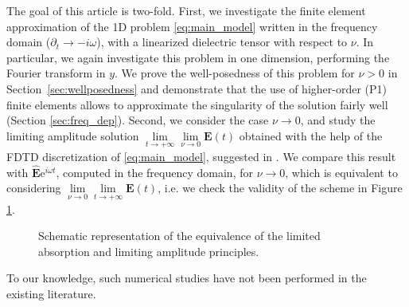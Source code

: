 The goal of this article is two-fold. 
First, we investigate the finite element approximation of the 1D 
problem \eqref{eq:main_model} written in the frequency domain ($\partial_t\rightarrow -i\omega$), with a linearized dielectric tensor with respect to $\nu$.
In particular, we again investigate this problem in one dimension, performing the Fourier transform in $y$.
We prove the well-posedness of this problem for $\nu>0$ in Section~\ref{sec:wellposedness} and 
demonstrate that the use of higher-order (P1) finite elements allows to approximate the singularity 
of the solution fairly well (Section \ref{sec:freq_dep}). 
Second, we consider the case $\nu\rightarrow 0$, and study the limiting amplitude solution 
$\lim\limits_{t\rightarrow +\infty}\lim\limits_{\nu\rightarrow 0}\mathbf{E}(t)$ obtained with the help of 
the FDTD discretization of \eqref{eq:main_model}, suggested in \cite{stable_yee_plasma_current}. 
We compare this result with 
$\hat{\mathbf{E}}\mathrm{e}^{i\omega t}$, computed in the frequency domain, for $\nu\rightarrow 0$, which is equivalent to considering
$\lim\limits_{\nu\rightarrow 0}\lim\limits_{t\rightarrow+\infty}\mathbf{E}(t)$, i.e. we check the validity of the scheme in Figure \ref{fig:limits}. 
\begin{figure}
 \caption{\label{fig:limits}Schematic representation of the equivalence of the limited absorption and limiting amplitude principles.}

\end{figure}

To our knowledge, such numerical studies have not been performed in the existing literature. 

